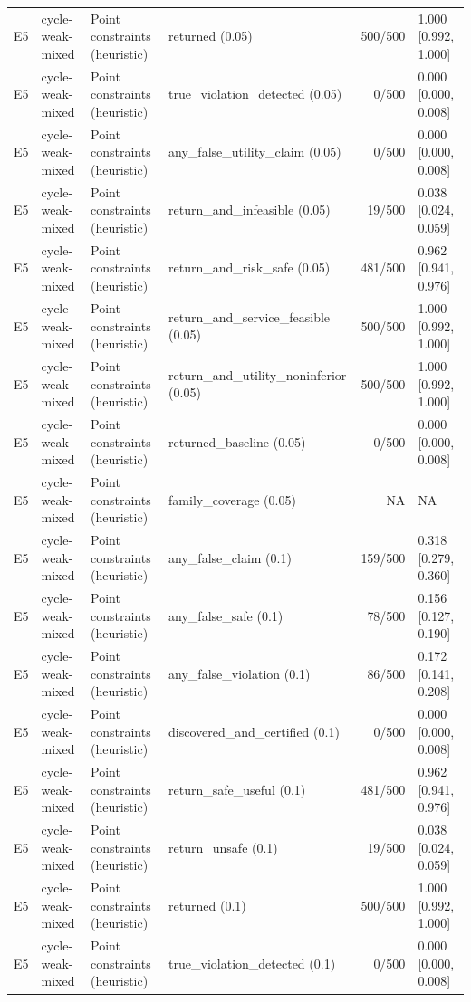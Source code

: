 \begin{longtable}{p{.04\linewidth}p{.18\linewidth}p{.19\linewidth}p{.16\linewidth}r p{.21\linewidth}}
E5 & cycle-weak-mixed & Point constraints (heuristic) & returned (0.05) & 500/500 & 1.000 [0.992, 1.000]\\
E5 & cycle-weak-mixed & Point constraints (heuristic) & true\_violation\_detected (0.05) & 0/500 & 0.000 [0.000, 0.008]\\
E5 & cycle-weak-mixed & Point constraints (heuristic) & any\_false\_utility\_claim (0.05) & 0/500 & 0.000 [0.000, 0.008]\\
E5 & cycle-weak-mixed & Point constraints (heuristic) & return\_and\_infeasible (0.05) & 19/500 & 0.038 [0.024, 0.059]\\
E5 & cycle-weak-mixed & Point constraints (heuristic) & return\_and\_risk\_safe (0.05) & 481/500 & 0.962 [0.941, 0.976]\\
E5 & cycle-weak-mixed & Point constraints (heuristic) & return\_and\_service\_feasible (0.05) & 500/500 & 1.000 [0.992, 1.000]\\
E5 & cycle-weak-mixed & Point constraints (heuristic) & return\_and\_utility\_noninferior (0.05) & 500/500 & 1.000 [0.992, 1.000]\\
E5 & cycle-weak-mixed & Point constraints (heuristic) & returned\_baseline (0.05) & 0/500 & 0.000 [0.000, 0.008]\\
E5 & cycle-weak-mixed & Point constraints (heuristic) & family\_coverage (0.05) & NA & NA\\
E5 & cycle-weak-mixed & Point constraints (heuristic) & any\_false\_claim (0.1) & 159/500 & 0.318 [0.279, 0.360]\\
E5 & cycle-weak-mixed & Point constraints (heuristic) & any\_false\_safe (0.1) & 78/500 & 0.156 [0.127, 0.190]\\
E5 & cycle-weak-mixed & Point constraints (heuristic) & any\_false\_violation (0.1) & 86/500 & 0.172 [0.141, 0.208]\\
E5 & cycle-weak-mixed & Point constraints (heuristic) & discovered\_and\_certified (0.1) & 0/500 & 0.000 [0.000, 0.008]\\
E5 & cycle-weak-mixed & Point constraints (heuristic) & return\_safe\_useful (0.1) & 481/500 & 0.962 [0.941, 0.976]\\
E5 & cycle-weak-mixed & Point constraints (heuristic) & return\_unsafe (0.1) & 19/500 & 0.038 [0.024, 0.059]\\
E5 & cycle-weak-mixed & Point constraints (heuristic) & returned (0.1) & 500/500 & 1.000 [0.992, 1.000]\\
E5 & cycle-weak-mixed & Point constraints (heuristic) & true\_violation\_detected (0.1) & 0/500 & 0.000 [0.000, 0.008]\\

\end{longtable}
